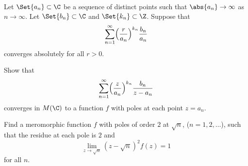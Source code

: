 \begin{exercise}
	Let $\Set{a_n} \subset \C$ be a sequence of distinct points such that $\abs{a_n} \to \infty$ as $n \to \infty$.
	Let $\Set{b_n} \subset \C$ and $\Set{k_n} \subset \Z$.
	Suppose that
	\[
		\sum_{n = 1}^\infty \Bigl( \frac{r}{a_n} \Bigr)^{k_n} \frac{b_n}{a_n}
	\]
	converges absolutely for all $r > 0$.

	Show that
	\[
		\sum_{n = 1}^\infty \Bigl ( \frac{z}{a_n} \Bigr)^{k_n} \frac{b_n}{z - a_n}
	\]
	converges in $M(\C)$ to a function $f$ with poles at each point $z = a_n$.
\end{exercise}

\begin{exercise}
	Find a meromorphic function $f$ with poles of order $2$ at $\sqrt{n}$, ($n = 1, 2, \dots$), such that the residue at each pole is $2$ and
	\[
		\lim_{z \to \sqrt{n}} (z - \sqrt{n})^2 f(z) = 1
	\]
	for all $n$.
\end{exercise}
